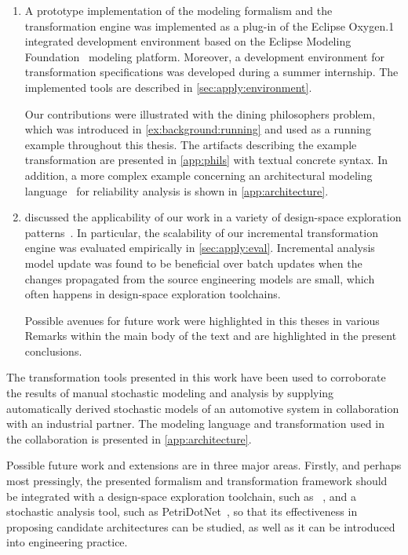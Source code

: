 \begin{enumerate}
\item A prototype implementation of the modeling formalism and the transformation engine was implemented as a plug-in of the Eclipse Oxygen.1 integrated development environment based on the Eclipse Modeling Foundation~\citep{Steinberg09emf} modeling platform. Moreover, a development environment for transformation specifications was developed during a summer internship. The implemented tools are described in \vref{sec:apply:environment}.

  Our contributions were illustrated with the dining philosophers problem, which was introduced in \vref{ex:background:running} and used as a running example throughout this thesis. The artifacts describing the example transformation are presented in \vref{app:phils} with textual concrete syntax. In addition, a more complex example concerning an architectural modeling language~\citep{Ecsedi16architecture} for reliability analysis is shown in \vref{app:architecture}.

\item {} discussed the applicability of our work in a variety of design-space exploration patterns~\citep{Vanherpen14patterns}. In particular, the scalability of our incremental transformation engine was evaluated empirically in \vref{sec:apply:eval}. Incremental analysis model update was found to be beneficial over batch updates when the changes propagated from the source engineering models are small, which often happens in design-space exploration toolchains. 

  Possible avenues for future work were highlighted in this theses in various Remarks within the main body of the text and are highlighted in the present conclusions.
\end{enumerate}

The transformation tools presented in this work have been used to corroborate the results of manual stochastic modeling and analysis by supplying automatically derived stochastic models of an automotive system in collaboration with an industrial partner. The modeling language and transformation used in the collaboration is presented in \cref{app:architecture}.

Possible future work and extensions are in three major areas. Firstly, and perhaps most pressingly, the presented formalism and transformation framework should be integrated with a design-space exploration toolchain, such as ~\citep{Hegedus13guided}, and a stochastic analysis tool, such as PetriDotNet~\citep{Voros17pdn}, so that its effectiveness in proposing candidate architectures can be studied, as well as it can be introduced into engineering practice.

